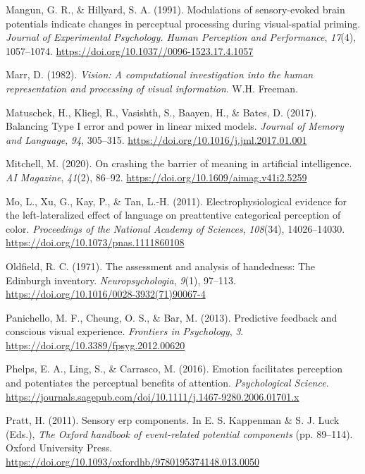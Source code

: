 \documentclass[
  english,
  man,floatsintext]{apa7}
\begin{document}
\leavevmode\hypertarget{ref-mangun1991}{}%
Mangun, G. R., \& Hillyard, S. A. (1991). Modulations of sensory-evoked brain potentials indicate changes in perceptual processing during visual-spatial priming. \emph{Journal of Experimental Psychology. Human Perception and Performance}, \emph{17}(4), 1057--1074. \url{https://doi.org/10.1037//0096-1523.17.4.1057}

\leavevmode\hypertarget{ref-marr1982}{}%
Marr, D. (1982). \emph{Vision: A computational investigation into the human representation and processing of visual information}. W.H. Freeman.

\leavevmode\hypertarget{ref-matuschek2017}{}%
Matuschek, H., Kliegl, R., Vasishth, S., Baayen, H., \& Bates, D. (2017). Balancing Type I error and power in linear mixed models. \emph{Journal of Memory and Language}, \emph{94}, 305--315. \url{https://doi.org/10.1016/j.jml.2017.01.001}

\leavevmode\hypertarget{ref-mitchell2020}{}%
Mitchell, M. (2020). On crashing the barrier of meaning in artificial intelligence. \emph{AI Magazine}, \emph{41}(2), 86--92. \url{https://doi.org/10.1609/aimag.v41i2.5259}

\leavevmode\hypertarget{ref-mo2011}{}%
Mo, L., Xu, G., Kay, P., \& Tan, L.-H. (2011). Electrophysiological evidence for the left-lateralized effect of language on preattentive categorical perception of color. \emph{Proceedings of the National Academy of Sciences}, \emph{108}(34), 14026--14030. \url{https://doi.org/10.1073/pnas.1111860108}

\leavevmode\hypertarget{ref-oldfield1971}{}%
Oldfield, R. C. (1971). The assessment and analysis of handedness: The Edinburgh inventory. \emph{Neuropsychologia}, \emph{9}(1), 97--113. \url{https://doi.org/10.1016/0028-3932(71)90067-4}

\leavevmode\hypertarget{ref-panichello2013}{}%
Panichello, M. F., Cheung, O. S., \& Bar, M. (2013). Predictive feedback and conscious visual experience. \emph{Frontiers in Psychology}, \emph{3}. \url{https://doi.org/10.3389/fpsyg.2012.00620}

\leavevmode\hypertarget{ref-phelps2016}{}%
Phelps, E. A., Ling, S., \& Carrasco, M. (2016). Emotion facilitates perception and potentiates the perceptual benefits of attention. \emph{Psychological Science}. \url{https://journals.sagepub.com/doi/10.1111/j.1467-9280.2006.01701.x}

\leavevmode\hypertarget{ref-pratt2011}{}%
Pratt, H. (2011). Sensory erp components. In E. S. Kappenman \& S. J. Luck (Eds.), \emph{The Oxford handbook of event-related potential components} (pp. 89--114). Oxford University Press. \url{https://doi.org/10.1093/oxfordhb/9780195374148.013.0050}
\end{document}
